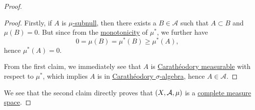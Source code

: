 \begin{proof}
\begin{proof}
		\par Firstly, if \(A\) is \hyperref[def:mu-subnull-set]{\(\mu \)-subnull}, then there exists a \(B\in \mathcal{A} \) such that \(A\subset B\) and \(\mu (B) = 0\). But since from
		the \hyperref[def:outer-measure-montonicity]{monotonicity} of \(\mu ^{*} \), we further have
		\[
			0 = \mu(B) = \mu ^{*} (B) \geq \mu ^{*} (A),
		\]
		hence \(\mu ^{*} (A) = 0\).

		\par  From the first claim, we immediately see that \(A\) is \hyperref[def:C-measurable]{Carathéodory measurable} with respect to \(\mu ^{*}\),
		which implies \(A\) is in \hyperref[thm:Caratheodory-extension-Thm]{Carathéodory \(\sigma\)-algebra}, hence \(A\in \mathcal{A} \).
	\end{proof}

	We see that the second claim directly proves that \((X, \mathcal{\MakeUppercase{a}} , \mu )\) is a \hyperref[def:complete-measure-space]{complete measure space}.
\end{proof}

